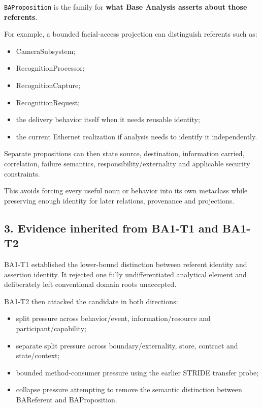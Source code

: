 \documentclass[
  10pt,
  a4paper,
]{article}
\providecommand{\tightlist}{%
  \setlength{\itemsep}{0pt}\setlength{\parskip}{0pt}}
\begin{document}
\texttt{BAProposition} is the family for \textbf{what Base Analysis
asserts about those referents}.

For example, a bounded facial-access projection can distinguish
referents such as:

\begin{itemize}
\tightlist
\item
  CameraSubsystem;
\item
  RecognitionProcessor;
\item
  RecognitionCapture;
\item
  RecognitionRequest;
\item
  the delivery behavior itself when it needs reusable identity;
\item
  the current Ethernet realization if analysis needs to identify it
  independently.
\end{itemize}

Separate propositions can then state source, destination, information
carried, correlation, failure semantics, responsibility/externality and
applicable security constraints.

This avoids forcing every useful noun or behavior into its own metaclass
while preserving enough identity for later relations, provenance and
projections.

\subsection{3. Evidence inherited from BA1-T1 and
BA1-T2}\label{evidence-inherited-from-ba1-t1-and-ba1-t2}

BA1-T1 established the lower-bound distinction between referent identity
and assertion identity. It rejected one fully undifferentiated
analytical element and deliberately left conventional domain roots
unaccepted.

BA1-T2 then attacked the candidate in both directions:

\begin{itemize}
\tightlist
\item
  split pressure across behavior/event, information/resource and
  participant/capability;
\item
  separate split pressure across boundary/externality, store, contract
  and state/context;
\item
  bounded method-consumer pressure using the earlier STRIDE transfer
  probe;
\item
  collapse pressure attempting to remove the semantic distinction
  between BAReferent and BAProposition.
\end{itemize}
\end{document}
